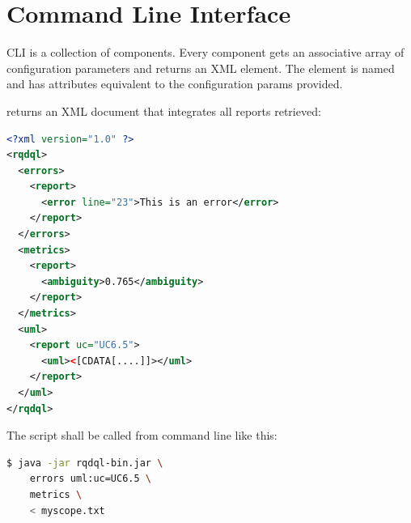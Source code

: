\documentclass[12pt,oneside,letterpaper]{article}
\begin{document}





\section{Command Line Interface}
\label{sec:front}

    CLI is a collection of components. Every component gets
    an associative array of configuration parameters
    and returns an XML element. The element is named 
    and has attributes equivalent to the configuration
    params provided.

     returns an XML document that integrates
    all reports retrieved:

    \begin{lstlisting}[language=XML]
<?xml version="1.0" ?>
<rqdql>
  <errors>
    <report>
      <error line="23">This is an error</error>
    </report>
  </errors>
  <metrics>
    <report>
      <ambiguity>0.765</ambiguity>
    </report>
  </metrics>
  <uml>
    <report uc="UC6.5">
      <uml><[CDATA[....]]></uml>
    </report>
  </uml>
</rqdql>
    \end{lstlisting}

    The script shall be called from command line like this:

    \begin{lstlisting}[language=bash]
$ java -jar rqdql-bin.jar \
    errors uml:uc=UC6.5 \
    metrics \
    < myscope.txt
    \end{lstlisting}
\end{document}

